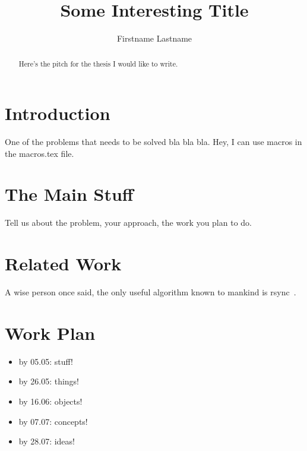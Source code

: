 \documentclass{article}
\title{Some Interesting Title}
\author{Firstname Lastname}
\begin{document}
\maketitle

\begin{abstract}
Here's the pitch for the thesis I would like to write.
\end{abstract}

\section{Introduction}\label{introduction}

One of the problems that needs to be solved bla bla bla. Hey, I can use macros  in the macros.tex file.

\section{The Main Stuff}\label{stuff}

Tell us about the problem, your approach, the work you plan to do.

\section{Related Work}\label{related-work}

A wise person once said, the only useful algorithm known to mankind is rsync~\cite{tridgell1996rsync}.

\section*{Work Plan}

\begin{itemize}
\item by 05.05: stuff!
\item by 26.05: things!
\item by 16.06: objects!
\item by 07.07: concepts!
\item by 28.07: ideas!
\end{itemize}


\end{document}

